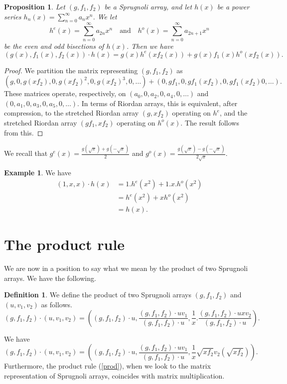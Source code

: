 \documentclass[12pt,reqno]{article}
\newtheorem{proposition}[theorem]{Proposition}
\theoremstyle{definition}
\newtheorem{definition}[theorem]{Definition}
\newtheorem{example}[theorem]{Example}
\begin{document}
\begin{proposition} Let $(g, f_1, f_2)$ be a Sprugnoli array, and let $h(x)$ be a power series $h_n(x)=\sum_{n=0}^{\infty} a_n x^n$. We let
$$h^e(x)=\sum_{n=0}^{\infty} a_{2n}x^n \quad\text{and}\quad h^o(x)=\sum_{n=0}^{\infty} a_{2n+1}x^n$$ be the even and odd bisections of $h(x)$. Then we have
$$(g(x), f_1(x), f_2(x))\cdot h(x)=g(x)h^e(xf_2(x))+g(x)f_1(x)h^o(xf_2(x)).$$
\end{proposition}
\begin{proof} We partition the matrix representing $(g, f_1, f_2)$ as
$$(g,0,g(xf_2),0,g(xf_2)^2,0,g(xf_2)^3,0,\ldots) + (0, gf_1, 0, gf_1(xf_2), 0, gf_1(xf_2)0,\ldots).$$
These matrices operate, respectively, on $(a_0,0,a_2,0,a_4,0,\ldots)$ and $(0,a_1,0,a_3,0,a_5,0,\ldots)$.
In terms of Riordan arrays, this is equivalent, after compression, to the stretched Riordan array $(g, xf_2)$ operating on $h^e$, and the
stretched Riordan array $(gf_1, xf_2)$ operating on $h^o(x)$. The result follows from this.
\end{proof}
We recall that $g^e(x)=\frac{g(\sqrt{x})+g(-\sqrt{x})}{2}$ and $g^o(x)=\frac{g(\sqrt{x})-g(-\sqrt{x})}{2\sqrt{x}}$.
\begin{example} We have
\begin{align*}(1, x, x) \cdot h(x)&= 1.h^e(x^2)+1.x.h^o(x^2)\\
&=h^e(x^2)+xh^o(x^2)\\
&=h(x).\end{align*}
\end{example}
\section{The product rule}
We are now in a position to say what we mean by the product of two Sprugnoli arrays. We have the following.
\begin{definition} We define the product of two Sprugnoli arrays $(g, f_1, f_2)$ and $(u, v_1, v_2)$ as follows.
\begin{equation}\label{prod}(g, f_1, f_2) \cdot (u, v_1, v_2)= \left((g,f_1,f_2)\cdot u, \frac{(g,f_1,f_2)\cdot u v_1}{(g,f_1,f_2)\cdot u}, \frac{1}{x}.\frac{(g,f_1,f_2)\cdot uxv_2}{ (g,f_1,f_2)\cdot u}\right).\end{equation}
\end{definition}
We have
\begin{equation}\label{prod2}(g, f_1, f_2) \cdot (u, v_1, v_2)= \left((g,f_1,f_2)\cdot u, \frac{(g,f_1,f_2)\cdot u v_1}{(g,f_1,f_2)\cdot u}, \frac{1}{x} \sqrt{xf_2}v_2(\sqrt{xf_2})\right).\end{equation}
Furthermore, the product rule (\ref{prod}), when we look to the matrix representation of Sprugnoli arrays, coincides with matrix multiplication.
\end{document}
